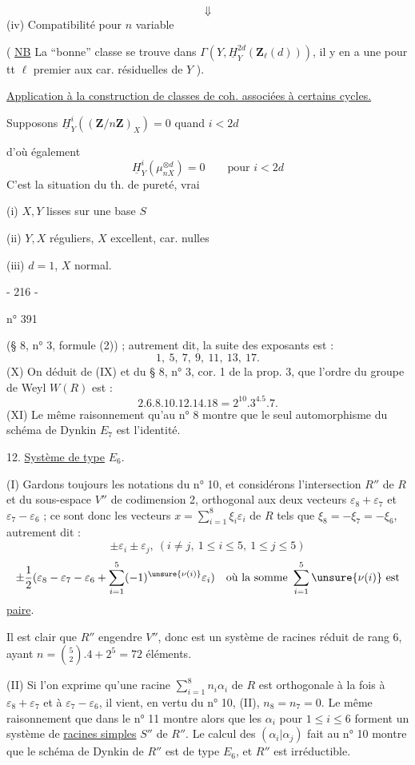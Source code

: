 \[\Downarrow\]
(iv) Compatibilité pour $n$ variable

( \uline{NB} La ``bonne'' classe se trouve dans
$\Gamma(Y,\underline H^{2d}_Y(\mathbf Z_\ell(d)))$, il y en a une pour tt $\ell$ premier aux car. résiduelles de $Y$ ).

\uline{Application à la construction de classes de coh. associées à certains cycles.}

Supposons $\underline H^i_Y((\mathbf Z/n\mathbf Z)_X)=0$  quand $i<2d$

d'où également
\[
\underline H^i_Y(\mu_{nX}^{\otimes d})=0\qquad\text{pour }i<2d
\]
C'est la situation du th. de pureté, vrai

(i) $X,Y$ lisses sur une base $S$

(ii) $Y,X$ réguliers, $X$ excellent, car. nulles

(iii) $d=1$, $X$ normal.
\begin{center}- 216 -\end{center}
\hfill n° 391

(§ 8, n° 3, formule (2)) ; autrement dit, la suite des exposants est :
\[
1,\ 5,\ 7,\ 9,\ 11,\ 13,\ 17.
\]
(X) On déduit de (IX) et du § 8, n° 3, cor. 1 de la prop. 3, que l'ordre du groupe de Weyl $W(R)$ est :
\[
2.6.8.10.12.14.18=2^{10}.3^4.5.7.
\]
(XI) Le même raisonnement qu'au n° 8 montre que le seul automorphisme du schéma de Dynkin $E_7$ est l'identité.

12. \uline{Système de type} $E_6$.

(I) Gardons toujours les notations du n° 10, et considérons l'intersection $R''$ de $R$ et du sous-espace $V''$ de codimension 2, orthogonal aux deux vecteurs $\varepsilon_8+\varepsilon_7$ et $\varepsilon_7-\varepsilon_6$ ; ce sont donc les vecteurs $x=\sum_{i=1}^8\xi_i\varepsilon_i$ de $R$ tels que $\xi_8=-\xi_7=-\xi_6$, autrement dit :
\[
\pm\varepsilon_i\pm\varepsilon_j,\ (i\ne j,\ 1\leq i\leq5,\ 1\leq j\leq5)
\]
\[
\pm\frac12(\varepsilon_8-\varepsilon_7-\varepsilon_6+\sum_{i=1}^5(-1)^{\unsure{\nu(i)}}\varepsilon_i)\quad\text{où la somme }\sum_{i=1}^5\unsure{\nu(i)}\text{ est}
\]
\uline{paire}.

Il est clair que $R''$ engendre $V''$, donc est un système de racines réduit de rang 6, ayant $n=\binom52.4+2^5=72$ éléments.

(II) Si l'on exprime qu'une racine $\sum_{i=1}^8n_i\alpha_i$ de $R$ est orthogonale à la fois à $\varepsilon_8+\varepsilon_7$ et à $\varepsilon_7-\varepsilon_6$, il vient, en vertu du n° 10, (II), $n_8=n_7=0$. Le même raisonnement que dans le n° 11 montre alors que les $\alpha_i$ pour $1\leq i\leq6$ forment un système de \uline{racines simples} $S''$ de $R''$. Le calcul des $(\alpha_i|\alpha_j)$ fait au n° 10 montre que le schéma de Dynkin de $R''$ est de type $E_6$, et $R''$ est irréductible.


